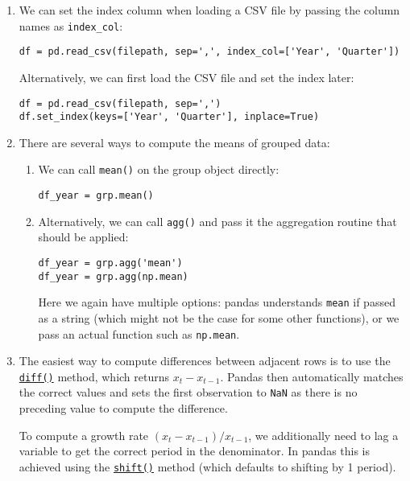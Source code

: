 \documentclass{scrartcl}
\begin{document}
\begin{enumerate}
\def\labelenumi{\arabic{enumi}.}
\item
  We can set the index column when loading a CSV file by passing the
  column names as \texttt{index\_col}:

\begin{verbatim}
df = pd.read_csv(filepath, sep=',', index_col=['Year', 'Quarter'])
\end{verbatim}

  Alternatively, we can first load the CSV file and set the index later:

\begin{verbatim}
df = pd.read_csv(filepath, sep=',')
df.set_index(keys=['Year', 'Quarter'], inplace=True)
\end{verbatim}
\item
  There are several ways to compute the means of grouped data:

  \begin{enumerate}
  \def\labelenumii{\arabic{enumii}.}
  \item
    We can call \texttt{mean()} on the group object directly:

\begin{verbatim}
df_year = grp.mean()
\end{verbatim}
  \item
    Alternatively, we can call \texttt{agg()} and pass it the
    aggregation routine that should be applied:

\begin{verbatim}
df_year = grp.agg('mean')
df_year = grp.agg(np.mean)
\end{verbatim}

    Here we again have multiple options: pandas understands
    \texttt{\textquotesingle{}mean\textquotesingle{}} if passed as a
    string (which might not be the case for some other functions), or we
    pass an actual function such as \texttt{np.mean}.
  \end{enumerate}
\item
  The easiest way to compute differences between adjacent rows is to use
  the
  \href{https://pandas.pydata.org/pandas-docs/stable/reference/api/pandas.DataFrame.diff.html}{\texttt{diff()}}
  method, which returns \(x_t - x_{t-1}\). Pandas then automatically
  matches the correct values and sets the first observation to
  \texttt{NaN} as there is no preceding value to compute the difference.

  To compute a growth rate \((x_t - x_{t-1})/x_{t-1}\), we additionally
  need to lag a variable to get the correct period in the denominator.
  In pandas this is achieved using the
  \href{https://pandas.pydata.org/pandas-docs/stable/reference/api/pandas.DataFrame.shift.html}{\texttt{shift()}}
  method (which defaults to shifting by 1 period).
\end{enumerate}
\end{document}
